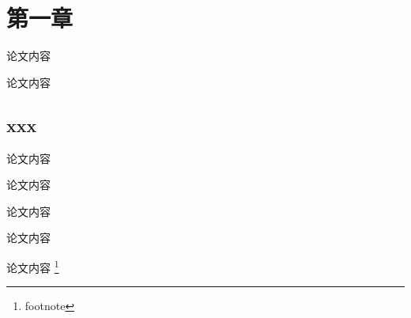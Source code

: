 \documentclass[a4paper,12pt]{ctexart}
\begin{document}
\makecoverpage

\section{第一章}

论文内容

论文内容

\subsection{xxx}
论文内容

论文内容

论文内容

论文内容

论文内容 \footnote{footnote}
\end{document}
